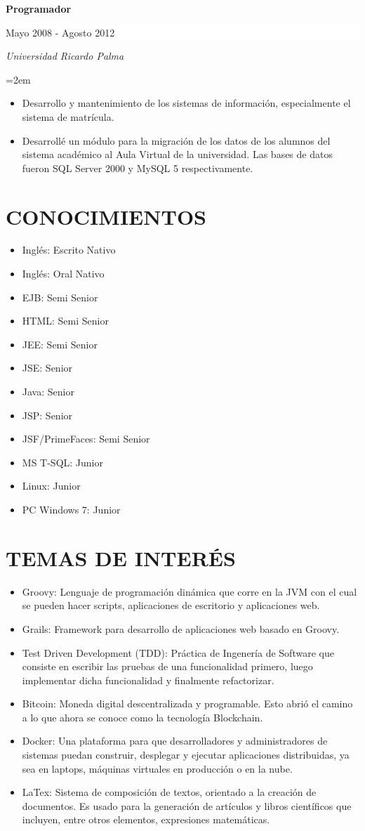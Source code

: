 \documentclass[paper=a4,fontsize=11pt]{scrartcl} %
\newcommand{\sepspace}{\vspace*{1em}}		%
\newcommand{\NewPart}[1]{\section*{\uppercase{#1}}}
\newcommand{\EducationEntry}[4]{
		\noindent \textbf{#1} \hfill      %
		\colorbox{White}{%
			\parbox{7cm}{%
			\hfill\color{Black}#2}} \par  %
		\noindent \textit{#3} \par        %
		\noindent\hangindent=2em\hangafter=0 \small #4 %
		\normalsize \par}
\begin{document}
\EducationEntry{Programador}{Mayo 2008 - Agosto 2012}{Universidad Ricardo Palma}{
\begin{itemize}
\item{Desarrollo y mantenimiento de los sistemas de información, especialmente el sistema de matrícula.}
\item{Desarrollé un módulo para la migración de los datos de los alumnos del sistema académico al Aula Virtual de la universidad. Las bases de datos fueron SQL Server 2000 y MySQL 5 respectivamente.}
\end{itemize}
}
\sepspace

\NewPart{Conocimientos}{}{}{
\begin{itemize}
\item{Inglés: Escrito Nativo}
\item{Inglés: Oral Nativo}
\item{EJB: Semi Senior}
\item{HTML: Semi Senior}
\item{JEE: Semi Senior}
\item{JSE: Senior}
\item{Java: Senior}
\item{JSP:  Senior}
\item{JSF/PrimeFaces: Semi Senior}
\item{MS T-SQL: Junior}
\item{Linux: Junior}
\item{PC Windows 7: Junior}

\end{itemize}
}

\NewPart{Temas de Interés}{}{}{
\begin{itemize}
\item{Groovy: Lenguaje de programación dinámica que corre en la JVM con el cual se pueden hacer scripts, aplicaciones de escritorio y aplicaciones web.}
\item{Grails: Framework para desarrollo de aplicaciones web basado en Groovy.}
\item{Test Driven Development (TDD): Práctica de Ingenería de Software que consiste en escribir las pruebas de una funcionalidad primero, luego implementar dicha funcionalidad y finalmente refactorizar.}
\item{Bitcoin: Moneda digital descentralizada y programable. Esto abrió el camino a lo que ahora se conoce como la tecnología Blockchain.}
\item{Docker: Una plataforma para que desarrolladores y administradores de sistemas puedan construir, desplegar y ejecutar aplicaciones distribuidas, ya sea en laptops, máquinas virtuales en producción o en la nube.}
\item{LaTex: Sistema de composición de textos, orientado a la creación de documentos. Es usado para la generación de artículos y libros científicos que incluyen, entre otros elementos, expresiones matemáticas.}
\end{itemize}
}
\end{document}
